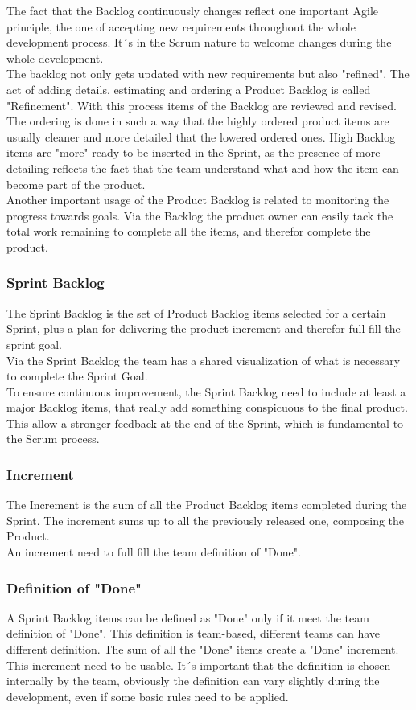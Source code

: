 \documentclass[../main.tex]{subfiles}
\begin{document}
The fact that the Backlog continuously changes reflect one important Agile principle, the one of accepting new requirements throughout the whole development process. It´s in the Scrum nature to welcome changes during the whole development.\\

The backlog not only gets updated with new requirements but also "refined". The act of adding details, estimating and ordering a Product Backlog is called "Refinement". With this process items of the Backlog are reviewed and revised. The ordering is done in such a way that the highly ordered product items are usually cleaner and more detailed that the lowered ordered ones. High Backlog items are "more" ready to be inserted in the Sprint, as the presence of more detailing reflects the fact that the team understand what and how the item can become part of the product. \\

Another important usage of the Product Backlog is related to monitoring the progress towards goals. Via the Backlog the product owner can easily tack the total work remaining to complete all the items, and therefor complete the product. 
\subsubsection{Sprint Backlog}
The Sprint Backlog is the set of Product Backlog items selected for a certain Sprint, plus a plan for delivering the product increment and therefor full fill the sprint goal.\\
Via the Sprint Backlog the team has a shared visualization of what is necessary to complete the Sprint Goal.\\
To ensure continuous improvement, the Sprint Backlog need to include at least a major Backlog items, that really add something conspicuous to the final product. This allow a stronger feedback at the end of the Sprint, which is fundamental to the Scrum process. 
\subsubsection{Increment}
The Increment is the sum of all the Product Backlog items completed during the Sprint. The increment sums up to all the previously released one, composing the Product.\\
An increment need to full fill the team definition of "Done".
\subsubsection{Definition of "Done"}
A Sprint Backlog items can be defined as "Done" only if it meet the team definition of "Done". This definition is team-based, different teams can have different definition. The sum of all the "Done" items create a "Done" increment. This increment need to be usable. It´s important that the definition is chosen internally by the team, obviously the definition can vary slightly during the development, even if some basic rules need to be applied.
\end{document}
